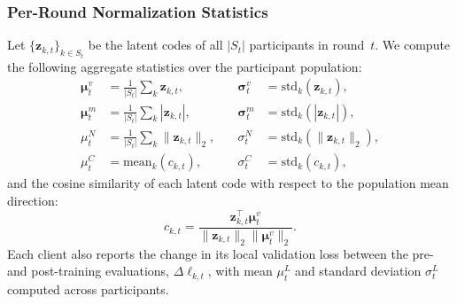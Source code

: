 \documentclass[journal]{IEEEtran}
\begin{document}
\subsubsection{Per-Round Normalization Statistics}
Let $\{\mathbf{z}_{k,t}\}_{k \in S_t}$ be the latent codes of all $|S_t|$ participants in round~$t$. We compute the following aggregate statistics over the participant population:
\begin{align}
\boldsymbol{\mu}_t^v &= \frac{1}{|S_t|} \sum_k \mathbf{z}_{k,t}, &\quad \boldsymbol{\sigma}_t^v &= \text{std}_k(\mathbf{z}_{k,t}), \label{eq:stats_v}\\
\boldsymbol{\mu}_t^m &= \frac{1}{|S_t|} \sum_k |\mathbf{z}_{k,t}|, &\quad \boldsymbol{\sigma}_t^m &= \text{std}_k(|\mathbf{z}_{k,t}|), \label{eq:stats_m}\\
\mu_t^N &= \frac{1}{|S_t|} \sum_k \|\mathbf{z}_{k,t}\|_2, &\quad \sigma_t^N &= \text{std}_k(\|\mathbf{z}_{k,t}\|_2), \label{eq:stats_n}\\
\mu_t^C &= \text{mean}_k(c_{k,t}), &\quad \sigma_t^C &= \text{std}_k(c_{k,t}), \label{eq:stats_c}
\end{align}
and the cosine similarity of each latent code with respect to the population mean direction:
\begin{equation}
c_{k,t} = \frac{\mathbf{z}_{k,t}^\top \boldsymbol{\mu}_t^v}{\|\mathbf{z}_{k,t}\|_2 \|\boldsymbol{\mu}_t^v\|_2}.
\label{eq:cosine}
\end{equation}
Each client also reports the change in its local validation loss between the pre- and post-training evaluations, $\Delta\ell_{k,t}$, with mean $\mu_t^L$ and standard deviation $\sigma_t^L$ computed across participants.
\end{document}
